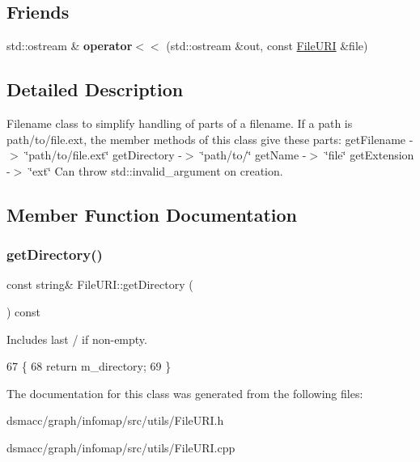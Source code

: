 \subsection*{Friends}
\begin{DoxyCompactItemize}
\item 
\mbox{\label{classFileURI_aa89acde077dab30dbab6ce85c282e512}} 
std\+::ostream \& {\bfseries operator$<$$<$} (std\+::ostream \&out, const \mbox{\hyperlink{classFileURI}{File\+U\+RI}} \&file)
\end{DoxyCompactItemize}


\subsection{Detailed Description}
Filename class to simplify handling of parts of a filename. If a path is path/to/file.\+ext, the member methods of this class give these parts\+: get\+Filename -\/$>$ \char`\"{}path/to/file.\+ext\char`\"{} get\+Directory -\/$>$ \char`\"{}path/to/\char`\"{} get\+Name -\/$>$ \char`\"{}file\char`\"{} get\+Extension -\/$>$ \char`\"{}ext\char`\"{} Can throw std\+::invalid\+\_\+argument on creation. 

\subsection{Member Function Documentation}
\mbox{\label{classFileURI_a9423995d29f27b5032c7061f4ea207f0}} 
\subsubsection{\texorpdfstring{get\+Directory()}{getDirectory()}}
{\footnotesize\ttfamily const string\& File\+U\+R\+I\+::get\+Directory (\begin{DoxyParamCaption}{ }\end{DoxyParamCaption}) const\hspace{0.3cm}{\ttfamily [inline]}}

Includes last \textquotesingle{}/\textquotesingle{} if non-\/empty. 
\begin{DoxyCode}
67     \{
68         \textcolor{keywordflow}{return} m\_directory;
69     \}
\end{DoxyCode}


The documentation for this class was generated from the following files\+:\begin{DoxyCompactItemize}
\item 
dsmacc/graph/infomap/src/utils/File\+U\+R\+I.\+h\item 
dsmacc/graph/infomap/src/utils/File\+U\+R\+I.\+cpp\end{DoxyCompactItemize}
